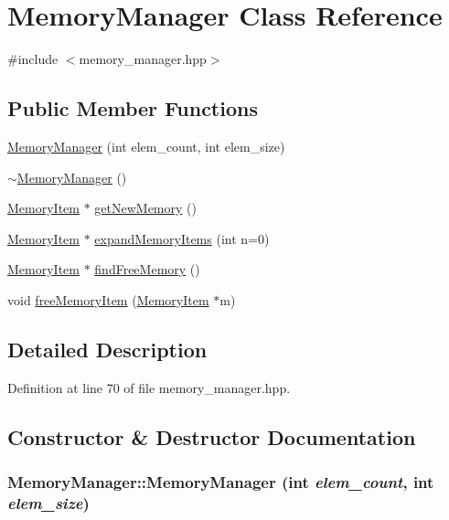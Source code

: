 \hypertarget{class_memory_manager}{
\section{MemoryManager Class Reference}
\label{class_memory_manager}
}


{\ttfamily \#include $<$memory\_\-manager.hpp$>$}\subsection*{Public Member Functions}
\begin{DoxyCompactItemize}
\item 
\hyperlink{class_memory_manager_a5b1191f93feb7d9e36ed3476b19ef3b1}{MemoryManager} (int elem\_\-count, int elem\_\-size)
\item 
\hyperlink{class_memory_manager_ad4570910ccfc14b2da679bee58ee8f48}{$\sim$MemoryManager} ()
\item 
\hyperlink{struct_memory_item}{MemoryItem} $\ast$ \hyperlink{class_memory_manager_acafc29252617db5b035895aadb2946d4}{getNewMemory} ()
\item 
\hyperlink{struct_memory_item}{MemoryItem} $\ast$ \hyperlink{class_memory_manager_a672f7255418e01cccc234b563068c39e}{expandMemoryItems} (int n=0)
\item 
\hyperlink{struct_memory_item}{MemoryItem} $\ast$ \hyperlink{class_memory_manager_abe914c7420e3ef7b101013e42b2a9602}{findFreeMemory} ()
\item 
void \hyperlink{class_memory_manager_a68915a0f823d79218e1db6746cd8199e}{freeMemoryItem} (\hyperlink{struct_memory_item}{MemoryItem} $\ast$m)
\end{DoxyCompactItemize}


\subsection{Detailed Description}


Definition at line 70 of file memory\_\-manager.hpp.

\subsection{Constructor \& Destructor Documentation}
\hypertarget{class_memory_manager_a5b1191f93feb7d9e36ed3476b19ef3b1}{
\subsubsection[{MemoryManager}]{\setlength{\rightskip}{0pt plus 5cm}MemoryManager::MemoryManager (int {\em elem\_\-count}, \/  int {\em elem\_\-size})}}
\label{class_memory_manager_a5b1191f93feb7d9e36ed3476b19ef3b1}


